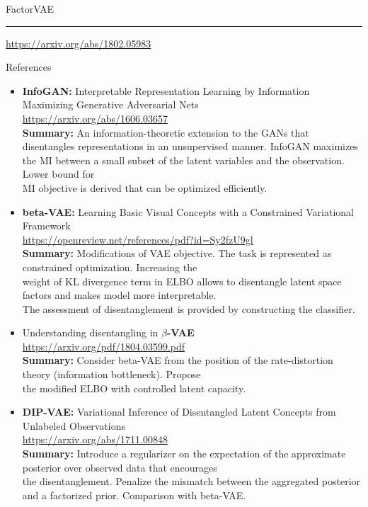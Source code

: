 \documentclass{beamer}
\begin{document}
\begin{frame}{FactorVAE}

	\vfill
	\hrule\medskip
	{\scriptsize \href{https://arxiv.org/abs/1802.05983}{https://arxiv.org/abs/1802.05983}}
\end{frame}
\begin{frame}{References}
{\tiny
\begin{itemize}
	
	\item \textbf{InfoGAN:} Interpretable Representation Learning by Information Maximizing Generative Adversarial Nets \\
	\href{https://arxiv.org/abs/1606.03657}{https://arxiv.org/abs/1606.03657} \\
	\textbf{Summary:} An information-theoretic extension to the GANs that disentangles representations in an unsupervised manner. InfoGAN maximizes the MI between a small subset of the latent variables and the observation. Lower bound for \\ MI objective is derived that can be optimized efficiently. 
    
    \item \textbf{beta-VAE:} Learning Basic Visual Concepts with a Constrained Variational Framework \\
    \href{https://openreview.net/references/pdf?id=Sy2fzU9gl}{https://openreview.net/references/pdf?id=Sy2fzU9gl} \\
    \textbf{Summary:} Modifications of VAE objective. The task is represented as constrained optimization. Increasing the \\ weight of KL divergence term in ELBO allows to disentangle latent space factors and makes model more interpretable. \\ The assessment of disentanglement is provided by constructing the classifier.
    
    \item Understanding disentangling in \textbf{$\beta$-VAE} \\
    \href{https://arxiv.org/pdf/1804.03599.pdf}{https://arxiv.org/pdf/1804.03599.pdf} \\
    \textbf{Summary:} Consider beta-VAE from the position of the rate-distortion theory (information bottleneck). Propose \\ the modified ELBO with controlled latent capacity.
    
    \item \textbf{DIP-VAE:} Variational Inference of Disentangled Latent Concepts from Unlabeled Observations \\
    \href{https://arxiv.org/abs/1711.00848}{https://arxiv.org/abs/1711.00848} \\
    \textbf{Summary:} Introduce a regularizer on the expectation of the approximate posterior over observed data that encourages \\ the disentanglement. Penalize the mismatch between the aggregated posterior and a factorized prior. Comparison with beta-VAE.
    

\end{itemize}}
\end{frame}
\end{document}
